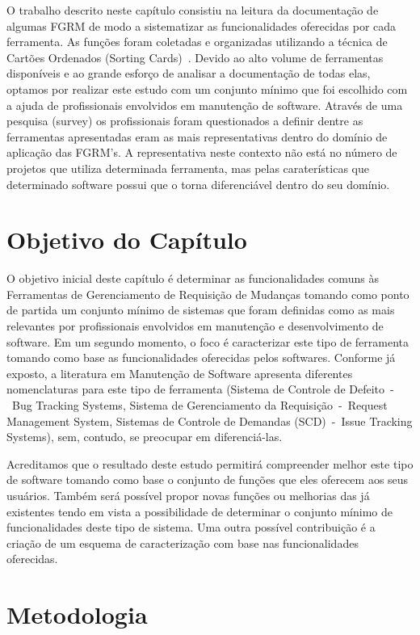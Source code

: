 O trabalho descrito neste capítulo consistiu na leitura da documentação de
algumas FGRM de modo a sistematizar as funcionalidades oferecidas por cada
ferramenta.  As funções foram coletadas e organizadas utilizando a técnica de
Cartões Ordenados (Sorting Cards)~\cite{5070993, rugg2005sorting}. Devido ao
alto volume de ferramentas disponíveis e ao grande esforço de analisar a
documentação de todas elas, optamos por realizar este estudo com um conjunto
mínimo que foi escolhido com a ajuda de profissionais envolvidos em manutenção
de software.  Através de uma pesquisa (survey) os profissionais foram
questionados a definir dentre as ferramentas apresentadas eram as mais
representativas dentro do domínio de aplicação das FGRM's. A representativa
neste contexto não está no número de projetos que utiliza determinada
ferramenta, mas pelas caraterísticas que determinado software possui que o torna
diferenciável dentro do seu domínio.

\section{Objetivo do Capítulo}
\label{sec:objetivo_do_capítulo}

O objetivo inicial deste capítulo é determinar as funcionalidades comuns às
Ferramentas de Gerenciamento de Requisição de Mudanças tomando como ponto de
partida um conjunto mínimo de sistemas que foram definidas como as mais
relevantes por profissionais envolvidos em manutenção e desenvolvimento de
software. Em um segundo momento, o foco é caracterizar este tipo de ferramenta
tomando como base as funcionalidades oferecidas pelos softwares. Conforme já
exposto, a literatura em Manutenção de Software apresenta diferentes
nomenclaturas para este tipo de ferramenta (Sistema de Controle de Defeito~-~Bug
Tracking Systems, Sistema de Gerenciamento da Requisição~-~Request Management
System, Sistemas de Controle de Demandas (SCD)~-~Issue Tracking Systems), sem,
contudo, se preocupar em diferenciá-las.

Acreditamos que o resultado deste estudo permitirá compreender melhor este tipo
de software tomando como base o conjunto de funções que eles oferecem aos seus
usuários. Também será possível propor novas funções ou melhorias das já
existentes tendo em vista a possibilidade de determinar o conjunto mínimo de
funcionalidades deste tipo de sistema. Uma outra possível contribuição é a
criação de um esquema de caracterização com base nas funcionalidades oferecidas.

\section{Metodologia}
\label{sec:metodologia}

